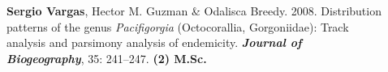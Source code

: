 \documentclass[letter,10pt]{article}
\begin{document}
\begin{description}






\item[]\textbf{Sergio Vargas}, Hector M. Guzman \& Odalisca Breedy. 2008. Distribution patterns of the genus \emph{Pacifigorgia} (Octocorallia, Gorgoniidae): Track analysis and parsimony analysis of endemicity. \textbf{\emph{Journal of Biogeography}}, 35: 241--247. \hfill\textbf{{\scriptsize (2) M.Sc.}}

\end{description}
\end{document}
